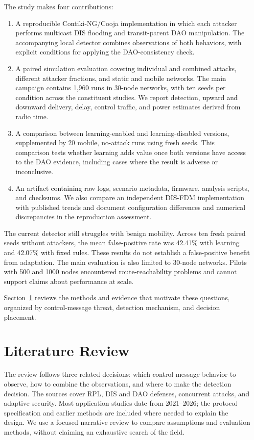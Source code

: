 \documentclass[journal]{IEEEtran}
\begin{document}
The study makes four contributions:
\begin{enumerate}
\item A reproducible Contiki-NG/Cooja implementation in which each attacker performs multicast DIS flooding and transit-parent DAO manipulation. The accompanying local detector combines observations of both behaviors, with explicit conditions for applying the DAO-consistency check.
\item A paired simulation evaluation covering individual and combined attacks, different attacker fractions, and static and mobile networks. The main campaign contains 1,960 runs in 30-node networks, with ten seeds per condition across the constituent studies. We report detection, upward and downward delivery, delay, control traffic, and power estimates derived from radio time.
\item A comparison between learning-enabled and learning-disabled versions, supplemented by 20 mobile, no-attack runs using fresh seeds. This comparison tests whether learning adds value once both versions have access to the DAO evidence, including cases where the result is adverse or inconclusive.
\item An artifact containing raw logs, scenario metadata, firmware, analysis scripts, and checksums. We also compare an independent DIS-FDM implementation with published trends and document configuration differences and numerical discrepancies in the reproduction assessment.
\end{enumerate}

The current detector still struggles with benign mobility. Across ten fresh paired seeds without attackers, the mean false-positive rate was 42.41\% with learning and 42.07\% with fixed rules. These results do not establish a false-positive benefit from adaptation. The main evaluation is also limited to 30-node networks. Pilots with 500 and 1000 nodes encountered route-reachability problems and cannot support claims about performance at scale.

Section~\ref{sec:related} reviews the methods and evidence that motivate these questions, organized by control-message threat, detection mechanism, and decision placement.

\section{Literature Review}\label{sec:related}
The review follows three related decisions: which control-message behavior to observe, how to combine the observations, and where to make the detection decision. The sources cover RPL, DIS and DAO defenses, concurrent attacks, and adaptive security. Most application studies date from 2021--2026; the protocol specification and earlier methods are included where needed to explain the design. We use a focused narrative review to compare assumptions and evaluation methods, without claiming an exhaustive search of the field.
\end{document}
